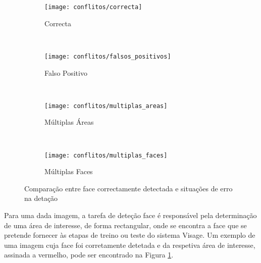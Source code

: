 \begin{figure}[t]
        \centering
        \begin{subfigure}[b]{0.2\textwidth}
                \centering
                \texttt{[image: conflitos/correcta]}
                \caption{Correcta}
                \label{fig:conflitos-correcta}
        \end{subfigure}%
        ~ 
        \begin{subfigure}[b]{0.2\textwidth}
                \centering
                \texttt{[image: conflitos/falsos\_positivos]}
                \caption{Falso Positivo}
                \label{fig:conflitos-falsos_positivos}
        \end{subfigure}
        ~ 
        \begin{subfigure}[b]{0.2\textwidth}
                \centering
                \texttt{[image: conflitos/multiplas\_areas]}
                \caption{Múltiplas Áreas}
                \label{fig:conflitos-multiplas_areas}
        \end{subfigure}
        ~ 
        \begin{subfigure}[b]{0.2\textwidth}
                \centering
                \texttt{[image: conflitos/multiplas\_faces]}
                \caption{Múltiplas Faces}
                \label{fig:conflitos-multiplas_faces}
        \end{subfigure}
        \caption{Comparação entre face correctamente detectada e situações de erro na detação}\label{fig:conflitos-detecao}
\end{figure}

Para uma dada imagem, a tarefa de deteção face é responsável pela determinação de uma área de interesse, de forma rectangular, onde se encontra a face que se pretende fornecer às etapas de treino ou teste do sistema Visage. Um exemplo de uma imagem cuja face foi corretamente detetada e da respetiva área de interesse, assinada a vermelho, pode ser encontrado na Figura \ref{fig:conflitos-correcta}.

